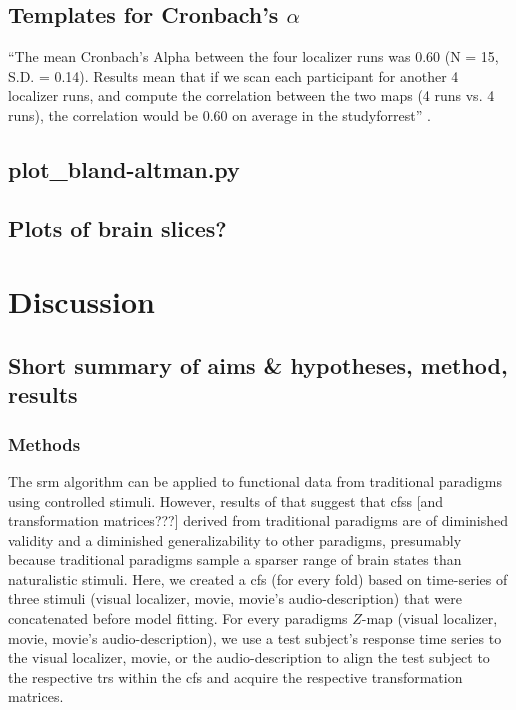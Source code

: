 \subsection{Templates for Cronbach's $\alpha$}

``The mean Cronbach's Alpha between the four localizer runs was 0.60 (N = 15,
S.D.  = 0.14).
%
Results mean that if we scan each participant for another 4 localizer runs, and
compute the correlation between the two maps (4 runs vs. 4 runs), the
correlation would be 0.60 on average in the studyforrest''
\citep{jiahui2020predicting}.



\subsection{plot\_bland-altman.py}



\subsection{Plots of brain slices?}






\section{Discussion}

\subsection{Short summary of aims \& hypotheses, method, results}



\subsubsection{Methods}

The \ac{srm} algorithm can be applied to functional data from traditional
paradigms using controlled stimuli.
%
However, results of \citet{haxby2011common} that suggest that \acp{cfs} [and
transformation matrices???] derived from traditional paradigms are of diminished
validity and a diminished generalizability to other paradigms, presumably
because traditional paradigms sample a sparser range of brain states than
naturalistic stimuli.
%
Here, we created a \ac{cfs} (for every fold) based on time-series of three
stimuli (visual localizer, movie, movie's audio-description) that were
concatenated before model fitting.
%
For every paradigms $Z$-map (visual localizer, movie, movie's
audio-description), we use a test subject's response time series to the visual
localizer, movie, or the audio-description to align the test subject to the
respective \acp{tr} within the \ac{cfs} and acquire the respective
transformation matrices.


